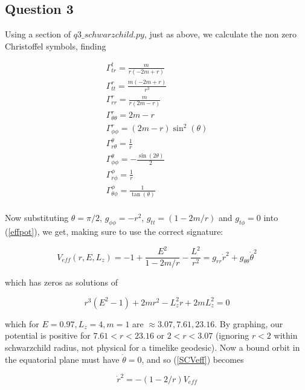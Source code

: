 \documentclass[10pt,a4paper]{report}
\begin{document}
\normalsize
\subsection*{Question 3}

Using a section of $q3\_schwarzchild.py$, just as above, we calculate the non zero Christoffel symbols, finding

\small\begin{align*}
\Gamma^t_{tr} = \frac{m}{r (- 2 m + r)}\\
\Gamma^r_{tt} = \frac{m (- 2 m + r)}{r^{3}}\\
\Gamma^r_{rr} = \frac{m}{r (2 m - r)}\\
\Gamma^r_{\theta\theta} = 2 m - r\\
\Gamma^r_{\phi\phi} = (2 m - r) \sin^{2}{(\theta )}\\
\Gamma^\theta_{r\theta} = \frac{1}{r}\\
\Gamma^\theta_{\phi\phi} = - \frac{\sin{(2 \theta )}}{2}\\
\Gamma^\phi_{r\phi} = \frac{1}{r}\\
\Gamma^\phi_{\theta\phi} = \frac{1}{\tan{(\theta )}}\\
\end{align*}

\normalsize
Now substituting $\theta=\pi/2$, $g_{\phi\phi} = -r^2$, $g_{tt}=(1-2m/r)$ and $g_{t\phi} = 0$ into (\ref{effpot}), we get, making sure to use the correct signature:

\begin{equation}
V_{eff}(r, E, L_z) = -1 + \frac{E^2}{1-2m/r} - \frac{L^2}{r^2} = g_{rr}\dot{r}^2+g_{\theta\theta}\dot{\theta}^2
\label{SCVeff}
\end{equation}

which has zeros as solutions of 

\begin{equation*}
r^3(E^2-1) + 2mr^2 -L_z^2r+2mL_z^2=0
\end{equation*}

which for $E=0.97, L_z=4, m=1$ are $\approx 3.07, 7.61, 23.16$. By graphing, our potential is positive for $7.61<r<23.16$ or $2<r<3.07$ (ignoring $r<2$ within schwarzchild radius, not physical for a timelike geodesic). Now a bound orbit in the equatorial plane must have $\dot{\theta}=0$, and so (\ref{SCVeff}) becomes

\begin{equation*}
\dot{r}^2 = -(1-2/r)V_{eff}
\end{equation*}
\end{document}
